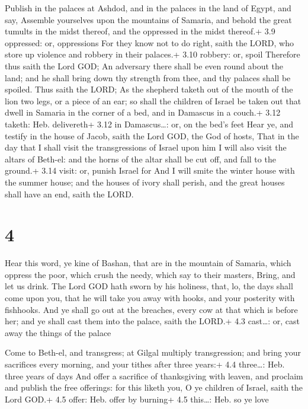  Publish in the palaces at Ashdod, and in the palaces in
the land of Egypt, and say, Assemble yourselves upon the mountains of
Samaria, and behold the great tumults in the midst thereof, and the
oppressed in the midst thereof.+ 3.9 oppressed: or, oppressions
 For they know not to do right, saith the LORD, who store
up violence and robbery in their palaces.+ 3.10 robbery: or, spoil
 Therefore thus saith the Lord GOD; An adversary there
shall be even round about the land; and he shall bring down thy strength
from thee, and thy palaces shall be spoiled.  Thus saith
the LORD; As the shepherd taketh out of the mouth of the lion two legs,
or a piece of an ear; so shall the children of Israel be taken out that
dwell in Samaria in the corner of a bed, and in Damascus in a couch.+
3.12 taketh: Heb. delivereth+ 3.12 in Damascus\ldots: or, on the bed's
feet  Hear ye, and testify in the house of Jacob, saith the
Lord GOD, the God of hosts,  That in the day that I shall
visit the transgressions of Israel upon him I will also visit the altars
of Beth-el: and the horns of the altar shall be cut off, and fall to the
ground.+ 3.14 visit: or, punish Israel for  And I will
smite the winter house with the summer house; and the houses of ivory
shall perish, and the great houses shall have an end, saith the LORD.

\hypertarget{section-3}{%
\section{4}\label{section-3}}

 Hear this word, ye kine of Bashan, that are in the mountain
of Samaria, which oppress the poor, which crush the needy, which say to
their masters, Bring, and let us drink.  The Lord GOD hath
sworn by his holiness, that, lo, the days shall come upon you, that he
will take you away with hooks, and your posterity with fishhooks.
 And ye shall go out at the breaches, every cow at that
which is before her; and ye shall cast them into the palace, saith the
LORD.+ 4.3 cast\ldots: or, cast away the things of the palace

 Come to Beth-el, and transgress; at Gilgal multiply
transgression; and bring your sacrifices every morning, and your tithes
after three years:+ 4.4 three\ldots: Heb. three years of days
 And offer a sacrifice of thanksgiving with leaven, and
proclaim and publish the free offerings: for this liketh you, O ye
children of Israel, saith the Lord GOD.+ 4.5 offer: Heb. offer by
burning+ 4.5 this\ldots: Heb. so ye love

